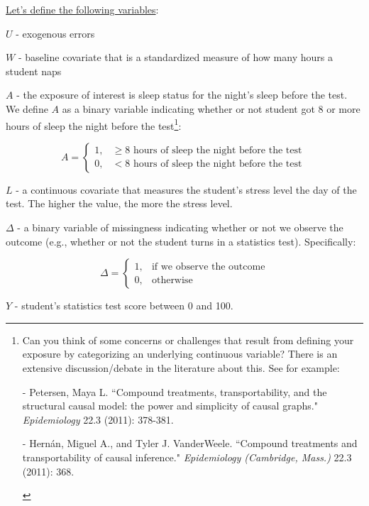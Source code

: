 \documentclass{exam}
\newenvironment{packed_item}{
\begin{itemize}
 \setlength{\itemsep}{0pt}
  \setlength{\parskip}{0pt}
  \setlength{\parsep}{0pt}
}{\end{itemize}}
\begin{document}
\underline{Let's define the following variables}: 
\begin{packed_item}
\item[] $U$ - exogenous errors
\item[] $W$ - baseline covariate that is a standardized measure of how many hours a student naps
\item[] $A$ - the exposure of interest is sleep status for the night's sleep before the test. We define $A$ as a binary variable indicating whether or not student got 8 or more hours of sleep the night before the test\footnote{Can you think of some concerns or challenges that result from defining your exposure by categorizing an underlying continuous variable? There is an extensive discussion/debate in the literature about this. See for example:
\begin{packed_item}
\item[-]Petersen, Maya L. ``Compound treatments, transportability, and the structural causal model: the power and simplicity of causal graphs." \textit{Epidemiology} 22.3 (2011): 378-381. 
\item[-] Hernán, Miguel A., and Tyler J. VanderWeele. ``Compound treatments and transportability of causal inference." \textit{Epidemiology (Cambridge, Mass.)} 22.3 (2011): 368.
\end{packed_item}
}:

  \begin{equation*}
    A=
    \begin{cases}
      1, & \geq 8 \text{ hours of sleep the night before the test}\ \\
      0, & < 8 \text{ hours of sleep the night before the test}
    \end{cases}
  \end{equation*}


  
\item[] $L$ - a continuous covariate that measures the student's stress level the day of the test. The higher the value, the more the stress level.
\item[] $\Delta$ - a binary variable of missingness indicating whether or not we observe the outcome (e.g., whether or not the student turns in a statistics test). Specifically:

  \begin{equation*}
    \Delta=
    \begin{cases}
      1, & \text{if we observe the outcome} \\
      0, & \text{otherwise}
    \end{cases}
  \end{equation*}


\item[] $Y$ - student's statistics test score between 0 and 100.
\end{packed_item}
\end{document}
